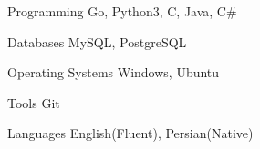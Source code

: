 

\begin{cvskills}

  \cvskill
    {Programming} %
    {Go, Python3, C, Java, C\#} %

  \cvskill
    {Databases} %
    {MySQL, PostgreSQL} %

  \cvskill
    {Operating Systems} %
    {Windows, Ubuntu} %

  \cvskill
    {Tools} %
    {Git} %
    
  \cvskill
    {Languages} %
    {English(Fluent), Persian(Native)} %

\end{cvskills}
